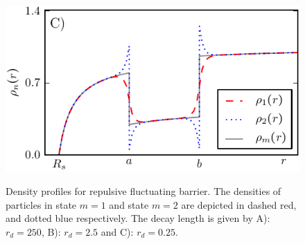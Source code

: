 \begin{minipage}[t]{0.5 \textwidth}
    \begin{figure}[H]
        \includegraphics[width = 1 \textwidth]{plots/d3.pdf}
    \end{figure}
\end{minipage}\hspace{0.02\textwidth}\begin{minipage}[t]{0.48 \textwidth}
    \begin{figure}[H]
        \caption{Density profiles for repulsive fluctuating barrier. The densities of particles in state $m=1$ and state $m=2$ are depicted in dashed red, and dotted blue respectively. The decay length is given by A): $r_d = 250$, B): $r_d=2.5$ and C): $r_d=0.25$. \label{rep_symm_dens_profile}}
    \end{figure}
\end{minipage}


